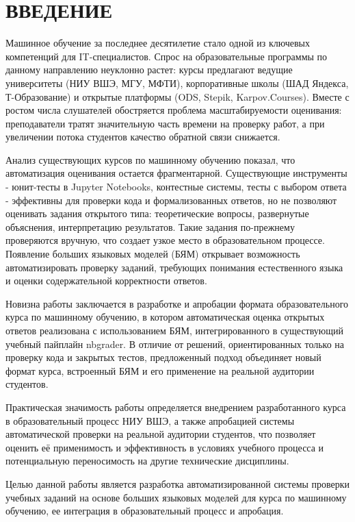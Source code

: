 \chapter*{ВВЕДЕНИЕ}
\sloppy

Машинное обучение за последнее десятилетие стало одной из ключевых компетенций для IT-специалистов. Спрос на образовательные программы по данному направлению неуклонно растет: курсы предлагают ведущие университеты (НИУ ВШЭ, МГУ, МФТИ), корпоративные школы (ШАД Яндекса, Т-Образование) и открытые платформы (ODS, Stepik, Karpov.Courses). Вместе с ростом числа слушателей обостряется проблема масштабируемости оценивания: преподаватели тратят значительную часть времени на проверку работ, а при увеличении потока студентов качество обратной связи снижается.

Анализ существующих курсов по машинному обучению показал, что автоматизация оценивания остается фрагментарной. Существующие инструменты - юнит-тесты в Jupyter Notebooks, контестные системы, тесты с выбором ответа - эффективны для проверки кода и формализованных ответов, но не позволяют оценивать задания открытого типа: теоретические вопросы, развернутые объяснения, интерпретацию результатов. Такие задания по-прежнему проверяются вручную, что создает узкое место в образовательном процессе. Появление больших языковых моделей (БЯМ) открывает возможность автоматизировать проверку заданий, требующих понимания естественного языка и оценки содержательной корректности ответов.

Новизна работы заключается в разработке и апробации формата образовательного курса по машинному обучению, в котором автоматическая оценка открытых ответов реализована с использованием БЯМ, интегрированного в существующий учебный пайплайн nbgrader. В отличие от решений, ориентированных только на проверку кода и закрытых тестов, предложенный подход объединяет новый формат курса, встроенный БЯМ и его применение на реальной аудитории студентов.

Практическая значимость работы определяется внедрением разработанного курса в образовательный процесс НИУ ВШЭ, а также апробацией системы автоматической проверки на реальной аудитории студентов, что позволяет оценить её применимость и эффективность в условиях учебного процесса и потенциальную переносимость на другие технические дисциплины.

Целью данной работы является разработка автоматизированной системы проверки учебных заданий на основе больших языковых моделей для курса по машинному обучению, ее интеграция в образовательный процесс и апробация.

